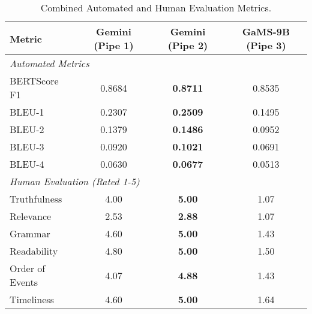 \documentclass[fleqn,moreauthors,10pt]{ds_report}
\begin{document}



\begin{table*}[t] 
\centering
\caption{Combined Automated and Human Evaluation Metrics. }
\label{tab:combined_results_appendix}
\begin{tabular}{lccc}
\toprule
\textbf{Metric} & \textbf{Gemini (Pipe 1)} & \textbf{Gemini (Pipe 2)} & \textbf{GaMS-9B (Pipe 3)} \\ 
\midrule
\multicolumn{4}{l}{\textit{Automated Metrics}} \\
\quad BERTScore F1    & 0.8684                   & \textbf{0.8711}          & 0.8535 \\
\quad BLEU-1          & 0.2307                   & \textbf{0.2509}          & 0.1495 \\
\quad BLEU-2          & 0.1379                   & \textbf{0.1486}          & 0.0952 \\
\quad BLEU-3          & 0.0920                   & \textbf{0.1021}          & 0.0691 \\
\quad BLEU-4          & 0.0630                   & \textbf{0.0677}          & 0.0513 \\
\midrule
\multicolumn{4}{l}{\textit{Human Evaluation (Rated 1-5)}} \\
\quad Truthfulness    & 4.00 & \textbf{5.00} & 1.07 \\
\quad Relevance       & 2.53 & \textbf{2.88} & 1.07 \\
\quad Grammar         & 4.60 & \textbf{5.00} & 1.43 \\
\quad Readability     & 4.80 & \textbf{5.00} & 1.50 \\
\quad Order of Events & 4.07 & \textbf{4.88} & 1.43 \\
\quad Timeliness      & 4.60 & \textbf{5.00} & 1.64 \\ 
\bottomrule
\end{tabular}
\end{table*}

\end{document}
